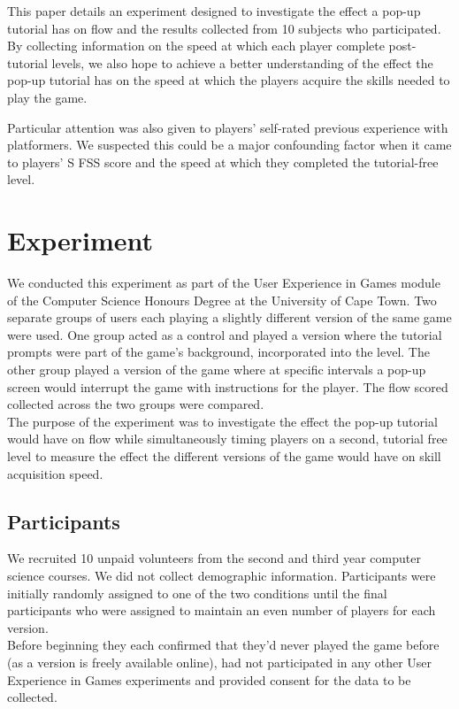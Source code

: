 \documentclass{acmsiggraph}
\begin{document}
This paper details an experiment designed to investigate the effect a pop-up tutorial has on flow and the results collected from 10 subjects who participated.  
By collecting information on the speed at which each player complete post-tutorial levels, we also hope to achieve a better understanding of the effect the pop-up tutorial has on the speed at which the players acquire the skills needed to play the game.

Particular attention was also given to players' self-rated previous experience with platformers. We suspected this could be a major confounding factor when it came to players' S FSS score and the speed at which they completed the tutorial-free level.

\section{Experiment}

We conducted this experiment as part of the User Experience in Games module of the Computer Science Honours Degree at the University of Cape Town. Two separate groups of users each playing a slightly different version of the same game were used. One group acted as a control and played a version where the tutorial prompts were part of the game's background, incorporated into the level. The other group played a version of the game where at specific intervals a pop-up screen would interrupt the game with instructions for the player. The flow scored collected across the two groups were compared.\\
The purpose of the experiment was to investigate the effect the pop-up tutorial would have on flow while simultaneously timing players on a second, tutorial free level to measure the effect the different versions of the game would have on skill acquisition speed.

\subsection{Participants}

We recruited 10 unpaid volunteers from the second and third year computer science courses. We did not collect demographic information. Participants were initially randomly assigned to one of the two conditions until the final participants who were assigned to maintain an even number of players for each version.\\
Before beginning they each confirmed that they'd never played the game before (as a version is freely available online)\cite{ssbb}, had not participated in any other User Experience in Games experiments and provided consent for the data to be collected.
\end{document}
